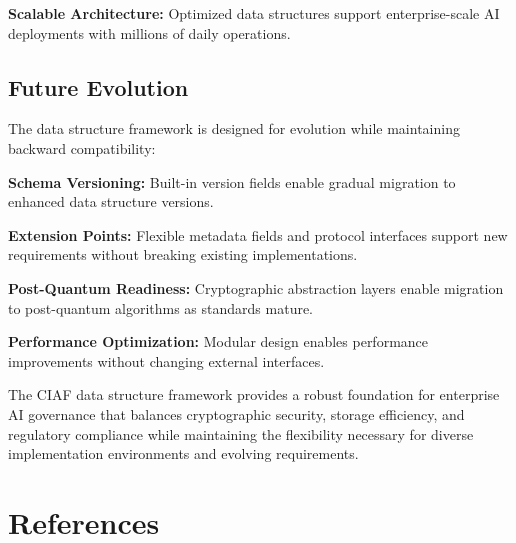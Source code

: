 \documentclass[12pt,a4paper]{article}
\begin{document}
\textbf{Scalable Architecture:} Optimized data structures support enterprise-scale AI deployments with millions of daily operations.

\subsection{Future Evolution}

The data structure framework is designed for evolution while maintaining backward compatibility:

\textbf{Schema Versioning:} Built-in version fields enable gradual migration to enhanced data structure versions.

\textbf{Extension Points:} Flexible metadata fields and protocol interfaces support new requirements without breaking existing implementations.

\textbf{Post-Quantum Readiness:} Cryptographic abstraction layers enable migration to post-quantum algorithms as standards mature.

\textbf{Performance Optimization:} Modular design enables performance improvements without changing external interfaces.

The CIAF data structure framework provides a robust foundation for enterprise AI governance that balances cryptographic security, storage efficiency, and regulatory compliance while maintaining the flexibility necessary for diverse implementation environments and evolving requirements.

\newpage

\section*{References}
\end{document}
